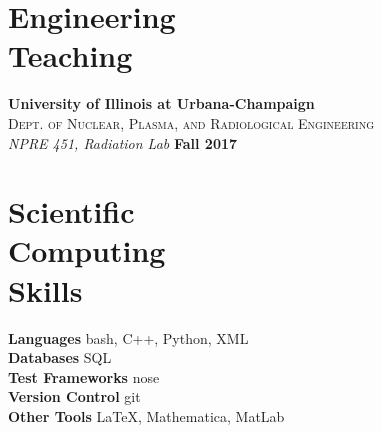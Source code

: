 \documentclass[margin,line]{resume}
\begin{document}
\begin{resume}
    \section{\mysidestyle Engineering\\Teaching}
    \textbf{University of Illinois at Urbana-Champaign}\\
    \textsc{Dept. of Nuclear, Plasma, and Radiological Engineering}\\ 
               \textsl{NPRE 451, Radiation Lab} \hfill \textbf{Fall 2017}\\
    
    \section{\mysidestyle Scientific\\Computing\\Skills}
                \textbf{Languages} \hfill bash, C++, Python, XML\vspace{.5mm}\\%
                \textbf{Databases} \hfill SQL\vspace{.5mm}\\%
                \textbf{Test Frameworks} \hfill nose\vspace{.5mm}\\%
                \textbf{Version Control} \hfill git\vspace{.5mm}\\%
                \textbf{Other Tools} \hfill \LaTeX, Mathematica, MatLab\vspace{.5mm}%






\end{resume}
\end{document}
